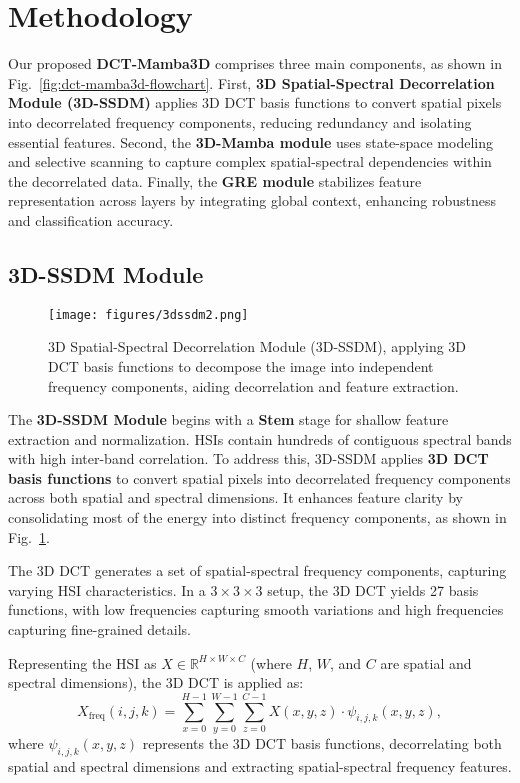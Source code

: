 \section{Methodology} \label{sec:methodology}

Our proposed \textbf{DCT-Mamba3D} comprises three main components, as shown in Fig.~\ref{fig:dct-mamba3d-flowchart}. First,  \textbf{3D Spatial-Spectral Decorrelation Module (3D-SSDM)} applies 3D DCT basis functions to convert spatial pixels into decorrelated frequency components, reducing redundancy and isolating essential features. Second, the \textbf{3D-Mamba module} uses state-space modeling and selective scanning to capture complex spatial-spectral dependencies within the decorrelated data. Finally, the \textbf{GRE module} stabilizes feature representation across layers by integrating global context, enhancing robustness and classification accuracy.


\subsection{3D-SSDM Module}

\begin{figure}[t]
    \centering
    \texttt{[image: figures/3dssdm2.png]}
    \caption{3D Spatial-Spectral Decorrelation Module (3D-SSDM), applying 3D DCT basis functions to decompose the image into independent frequency components, aiding decorrelation and feature extraction.}
    \label{fig:3dssdm}
\end{figure}

The \textbf{3D-SSDM Module} begins with a \textbf{Stem} stage for shallow feature extraction and normalization. HSIs contain hundreds of contiguous spectral bands with high inter-band correlation. To address this, 3D-SSDM applies \textbf{3D DCT basis functions} to convert spatial pixels into decorrelated frequency components across both spatial and spectral dimensions. It enhances feature clarity by consolidating most of the energy into distinct frequency components, as shown in Fig.~\ref{fig:3dssdm}.

The 3D DCT generates a set of spatial-spectral frequency components, capturing varying HSI characteristics. In a \(3 \times 3 \times 3\) setup, the 3D DCT yields 27 basis functions, with low frequencies capturing smooth variations and high frequencies capturing fine-grained details.

Representing the HSI as \( X \in \mathbb{R}^{H \times W \times C} \) (where \( H \), \( W \), and \( C \) are spatial and spectral dimensions), the 3D DCT is applied as:
\begin{equation}
X_{\text{freq}}(i, j, k) = \sum_{x=0}^{H-1} \sum_{y=0}^{W-1} \sum_{z=0}^{C-1} X(x, y, z) \cdot \psi_{i,j,k}(x, y, z),
\end{equation}
where \( \psi_{i,j,k}(x, y, z) \) represents the 3D DCT basis functions, decorrelating both spatial and spectral dimensions and extracting spatial-spectral frequency features.

